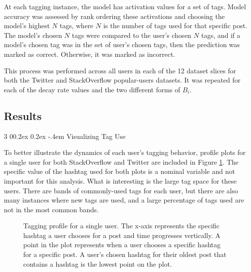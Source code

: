 \documentclass[man,floatsintext,donotrepeattitle]{apa6}
\makeatletter
\renewcommand{\subsubsection}{%
  \@startsection
  {subsubsection}%
  {3}%
  {\parindent}%
  {0\baselineskip \@plus 0.2ex \@minus 0.2ex}%
  {-.4em}%
  {\normalfont\normalsize\bfseries\addperi}}
\makeatother
\begin{document}
At each tagging instance, the model has activation values for a set of tags.
Model accuracy was assessed by rank ordering these activations and choosing the model's highest $N$ tags, where $N$ is the number of tags used for that specific post.
The model's chosen $N$ tags were compared to the user's chosen $N$ tags, and if a model's chosen tag was in the set of user's chosen tags, then the prediction was marked as correct.
Otherwise, it was marked as incorrect.

This process was performed across all users in each of the 12 dataset slices for both the Twitter and StackOverflow popular-users datasets.
It was repeated for each of the decay rate values and the two different forms of $B_{i}$.

\subsection{Results}

\subsubsection{Visualizing Tag Use}

To better illustrate the dynamics of each user's tagging behavior,
profile plots for a single user for both StackOverflow and Twitter are included in Figure \ref{figPriorHTByTime}.
The specific value of the hashtag used for both plots is a nominal variable and not important for this analysis.
What is interesting is the large tag space for these users.
There are bands of commonly-used tags for each user, but there are also many instances where new tags are used, and a large percentage of tags used are not in the most common bands.

\begin{figure}[!htbp]
  {%
    \setlength{\fboxsep}{0pt}%
    \setlength{\fboxrule}{1pt}%
    \hfill
    \hfill
    \caption{
      Tagging profile for a single user.
      The x-axis represents the specific hashtag a user chooses for a post and time progresses vertically.
      A point in the plot represents when a user chooses a specific hashtag for a specific post.
      A user's chosen hashtag for their oldest post that contains a hashtag is the lowest point on the plot.
    }
    \label{figPriorHTByTime}
  }%
\end{figure}
\end{document}
